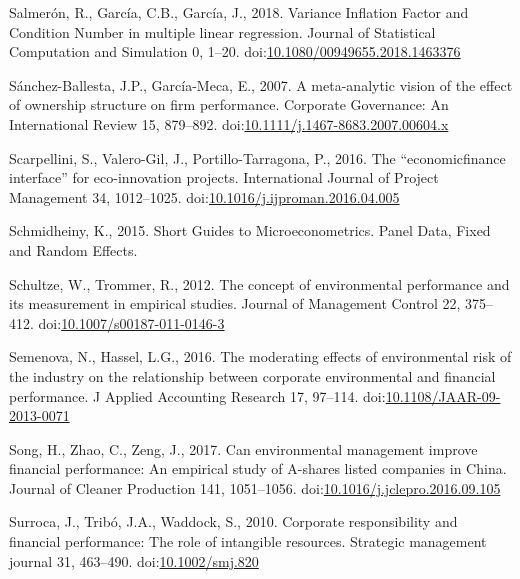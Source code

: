 \documentclass[12pt,]{article}
\begin{document}
\hypertarget{ref-Salmeron2018}{}
Salmerón, R., García, C.B., García, J., 2018. Variance Inflation Factor
and Condition Number in multiple linear regression. Journal of
Statistical Computation and Simulation 0, 1--20.
doi:\href{https://doi.org/10.1080/00949655.2018.1463376}{10.1080/00949655.2018.1463376}

\hypertarget{ref-Sanchez-Ballesta2007}{}
Sánchez-Ballesta, J.P., García-Meca, E., 2007. A meta-analytic vision of
the effect of ownership structure on firm performance. Corporate
Governance: An International Review 15, 879--892.
doi:\href{https://doi.org/10.1111/j.1467-8683.2007.00604.x}{10.1111/j.1467-8683.2007.00604.x}

\hypertarget{ref-Scarpellinieconomicfinanceinterface2016}{}
Scarpellini, S., Valero-Gil, J., Portillo-Tarragona, P., 2016. The
``economicfinance interface'' for eco-innovation projects. International
Journal of Project Management 34, 1012--1025.
doi:\href{https://doi.org/10.1016/j.ijproman.2016.04.005}{10.1016/j.ijproman.2016.04.005}

\hypertarget{ref-Schmidheiny2015}{}
Schmidheiny, K., 2015. Short Guides to Microeconometrics. Panel Data,
Fixed and Random Effects.

\hypertarget{ref-Schultze2012}{}
Schultze, W., Trommer, R., 2012. The concept of environmental
performance and its measurement in empirical studies. Journal of
Management Control 22, 375--412.
doi:\href{https://doi.org/10.1007/s00187-011-0146-3}{10.1007/s00187-011-0146-3}

\hypertarget{ref-Semenova2016}{}
Semenova, N., Hassel, L.G., 2016. The moderating effects of
environmental risk of the industry on the relationship between corporate
environmental and financial performance. J Applied Accounting Research
17, 97--114.
doi:\href{https://doi.org/10.1108/JAAR-09-2013-0071}{10.1108/JAAR-09-2013-0071}

\hypertarget{ref-SongCanenvironmentalmanagement2017}{}
Song, H., Zhao, C., Zeng, J., 2017. Can environmental management improve
financial performance: An empirical study of A-shares listed companies
in China. Journal of Cleaner Production 141, 1051--1056.
doi:\href{https://doi.org/10.1016/j.jclepro.2016.09.105}{10.1016/j.jclepro.2016.09.105}

\hypertarget{ref-Surroca2010}{}
Surroca, J., Tribó, J.A., Waddock, S., 2010. Corporate responsibility
and financial performance: The role of intangible resources. Strategic
management journal 31, 463--490.
doi:\href{https://doi.org/10.1002/smj.820}{10.1002/smj.820}
\end{document}
